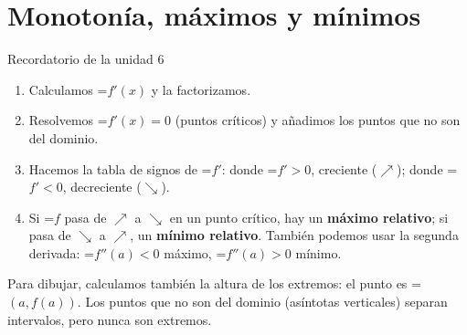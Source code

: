 \documentclass[11pt,a4paper]{article}
\newcommand{\lt}{<}\newcommand{\gt}{>}
\newcommand{\fmm}[1]{\setbox0=\hbox{$#1$}\ifdim\wd0>\linewidth\[#1\]\else\mbox{\box0}\fi}
\begin{document}
  
\section{Monotonía, máximos y mínimos}\hypertarget{sec6}{}

  

  
\begin{fmdef}{Recordatorio de la unidad 6}
\begin{enumerate}
\item Calculamos \fmm{f'(x)} y la factorizamos.
\item Resolvemos \fmm{f'(x)=0} (puntos críticos) y añadimos los puntos que no son del dominio.
\item Hacemos la tabla de signos de \fmm{f'}: donde \fmm{f'\gt0}, creciente ($\nearrow$); donde \fmm{f'\lt0}, decreciente ($\searrow$).
\item Si \fmm{f} pasa de $\nearrow$ a $\searrow$ en un punto crítico, hay un \textbf{máximo relativo}; si pasa de $\searrow$ a $\nearrow$, un \textbf{mínimo relativo}. También podemos usar la segunda derivada: \fmm{f''(a)\lt0} máximo, \fmm{f''(a)\gt0} mínimo.
\end{enumerate}

      
\begin{fmnote}Para dibujar, calculamos también la altura de los extremos: el punto es \fmm{(a,f(a))}. Los puntos que no son del dominio (asíntotas verticales) separan intervalos, pero nunca son extremos.\end{fmnote}
\end{fmdef}
\end{document}

